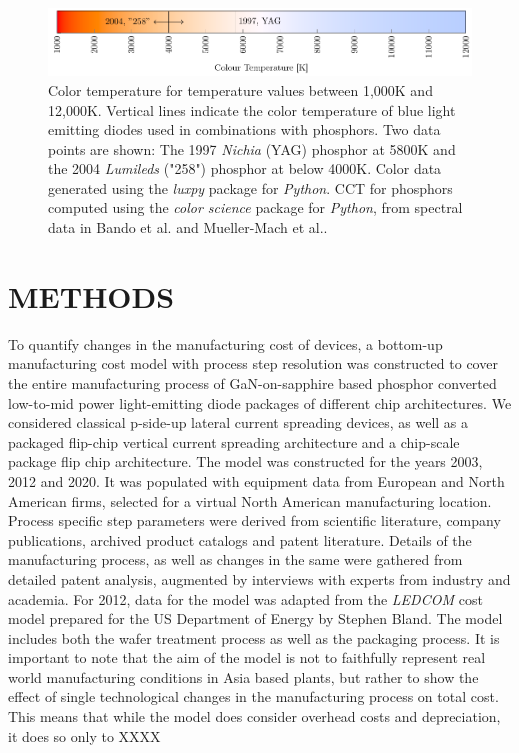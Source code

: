 \documentclass[a4paper,nocompress]{spie}  %
\begin{document}
\begin{figure} [ht]
    \begin{center}
        \includegraphics[width=\textwidth]{SPIE/article/cct_spectrum.pdf}
    \end{center}
    \caption{Color temperature for temperature values between 1,000K and 12,000K. Vertical lines indicate the color temperature of blue light emitting diodes used in combinations with phosphors. Two data points are shown: The 1997 \textit{Nichia}  (YAG) phosphor at 5800K and the 2004 \textit{Lumileds}  ("258") phosphor at below 4000K. Color data generated using the \textit{luxpy} package for \textit{Python}. CCT for phosphors computed using the \textit{color science} package for \textit{Python}, from spectral data in Bando et al.  \cite{bando1998development} and Mueller-Mach et al.\cite{MuellerMach2005}.}
    \label{fig:cct}
\end{figure}

\clearpage

\section{METHODS}
\label{sec:methods}

To quantify changes in the manufacturing cost of devices, a bottom-up manufacturing cost model with process step resolution was constructed to cover the entire manufacturing process of GaN-on-sapphire based phosphor converted low-to-mid power light-emitting diode packages of different chip architectures. We considered classical p-side-up lateral current spreading devices, as well as a packaged flip-chip vertical current spreading architecture and a chip-scale package flip chip architecture. The model was constructed for the years 2003, 2012 and 2020. It was populated with equipment data from European and North American firms, selected for a virtual North American manufacturing location. Process specific step parameters were derived from scientific literature, company publications, archived product catalogs and patent literature. Details of the manufacturing process, as well as changes in the same were gathered from detailed patent analysis, augmented by interviews with experts from industry and academia. For 2012, data for the model was adapted from the \textit{LEDCOM} cost model prepared for the US Department of Energy by Stephen Bland. The model includes both the wafer treatment process as well as the packaging process. It is important to note that the aim of the model is not to faithfully represent real world manufacturing conditions in Asia based plants, but rather to show the effect of single technological changes in the manufacturing process on total cost. This means that while the model does consider overhead costs and depreciation, it does so only to XXXX 
\end{document}
